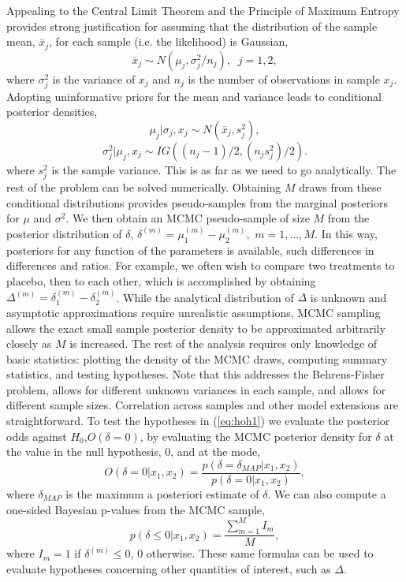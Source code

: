 \documentclass{juliacon}
\begin{document}
Appealing to the Central Limit Theorem and the Principle of Maximum Entropy provides strong justification for assuming that the distribution of the sample mean, $\bar{x}_j$, for each sample (i.e. the likelihood) is Gaussian, 
\begin{equation}
\bar{x}_j \sim N(\mu_j,\sigma_j^2/n_j ), \; \;    j=1,2,
\label{eq:xbar}
\end{equation}
where $\sigma_j^2$ is the variance of $x_j$ and $n_j$ is the number of observations in sample $x_j$. Adopting uninformative priors for the mean and variance leads to conditional posterior densities,
\begin{equation}
\mu_j | \sigma_j,x_j \sim N(\bar{x}_j, s_j^2),
\label{eq:muj}
\end{equation}
\begin{equation}
\sigma_j^2|\mu_j,x_j \sim IG((n_j-1)/2,(n_js_j^2)/2).
\label{eq:sigmaj}
\end{equation}
where $s_j^2$ is the sample variance. This is as far as we need to go analytically.  The rest of the problem can be solved numerically.
\vskip 6pt
Obtaining $M$ draws from these conditional distributions provides pseudo-samples from the marginal posteriors for $\mu$ and $\sigma^2$.  We then obtain an MCMC pseudo-sample of size $M$ from the posterior distribution of $\delta$, $\delta^{(m)} = \mu_1^{(m)} - \mu_2^{(m)},$ $m = 1,...,M$.  In this way, posteriors for any function of the parameters is available, such differences in differences and ratios. For example, we often wish to compare two treatments to placebo, then to each other, which is accomplished by obtaining $\Delta^{(m)} = \delta_1^{(m)} - \delta_2^{(m)}$. While the analytical distribution of $\Delta$ is unknown and asymptotic approximations require unrealistic assumptions,  MCMC sampling allows the exact small sample posterior density to be approximated arbitrarily closely as $M$ is increased. The rest of the analysis requires only knowledge of basic statistics: plotting the density of the MCMC draws, computing summary statistics, and testing hypotheses.   Note that this addresses the Behrens-Fisher problem, allows for different unknown variances in each sample, and allows for different sample sizes.  Correlation across samples and other model extensions are straightforward.
\vskip 6pt
To test the hypotheses in (\ref{eq:hoh1}) we evaluate the posterior odds against $H_0$,$ O(\delta = 0)$, by evaluating the MCMC posterior density for $\delta$ at the value in the null hypothesis, $0$, and at the mode,
\begin{equation}
O(\delta = 0|x_1, x_2) = \frac{p(\delta=\delta_{MAP}|x_1,x_2)}{p(\delta=0|x_1,x_2)},
\label{eq:odds}
\end{equation}
where $\delta_{MAP}$ is the maximum a posteriori estimate of $\delta$.
We can also compute a one-sided Bayesian p-values from the MCMC sample,
\begin{equation}
p(\delta \le 0|x_1, x_2) =  \frac{\sum_{m=1}^M I_m }  {M},
\label{eq:pval}
\end{equation}
where $I_m = 1$ if  $\delta^{(m)} \le 0$, $0$ otherwise.  These same formulas can be used to evaluate hypotheses concerning other quantities of interest, such as $\Delta$.
\end{document}
